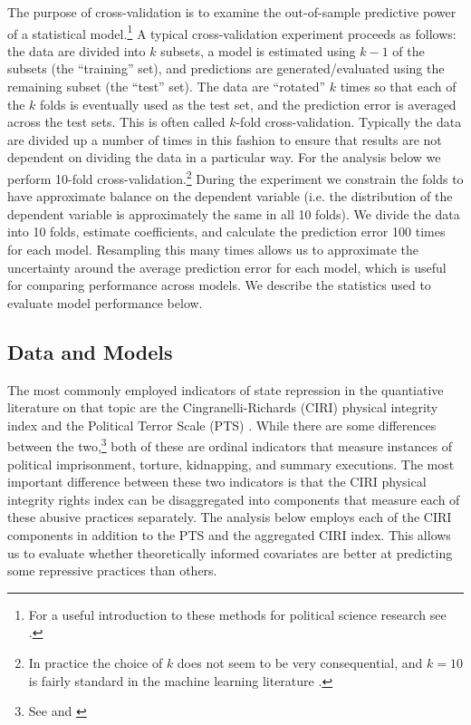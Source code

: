 \documentclass[12pt]{article}
\begin{document}
The purpose of cross-validation is to examine the out-of-sample predictive power of a statistical model.\footnote{For a useful introduction to these methods for political science research see \citet{LeeAhlquist2011}.} A typical cross-validation experiment proceeds as follows: the data are divided into $k$ subsets, a model is estimated using $k-1$ of the subsets (the ``training'' set), and predictions are generated/evaluated using the remaining subset (the ``test'' set). The data are ``rotated'' $k$ times so that each of the $k$ folds is eventually used as the test set, and the prediction error is averaged across the test sets. This is often called $k$-fold cross-validation. Typically the data are divided up a number of times in this fashion to ensure that results are not dependent on dividing the data in a particular way. For the analysis below we perform 10-fold cross-validation.\footnote{In practice the choice of $k$ does not seem to be very consequential, and $k=10$ is fairly standard in the machine learning literature \citep[See, e.g.][]{HastieTibshiraniFriedman2008}.} During the experiment we constrain the folds to have approximate balance on the dependent variable (i.e. the distribution of the dependent variable is approximately the same in all 10 folds). We divide the data into 10 folds, estimate coefficients, and calculate the prediction error 100 times for each model.  Resampling this many times allows us to approximate the uncertainty around the average prediction error for each model, which is useful for comparing performance across models. We describe the statistics used to evaluate model performance below. 

\subsection{Data and Models}

The most commonly employed indicators of state repression in the quantiative literature on that topic are the Cingranelli-Richards (CIRI) physical integrity index \citep{CIRI2010} and the Political Terror Scale (PTS) \citep{GibneyCornettWood2009}. While there are some differences between the two,\footnote{See \citet{WoodGibney2010} and \citet{CingranelliRichards2010}} both of these are ordinal indicators that measure instances of political imprisonment, torture, kidnapping, and summary executions. The most important difference between these two indicators is that the CIRI physical integrity rights index can be disaggregated into components that measure each of these abusive practices separately. The analysis below employs each of the CIRI components in addition to the PTS and the aggregated CIRI index. This allows us to evaluate whether theoretically informed covariates are better at predicting some repressive practices than others. 
\end{document}

